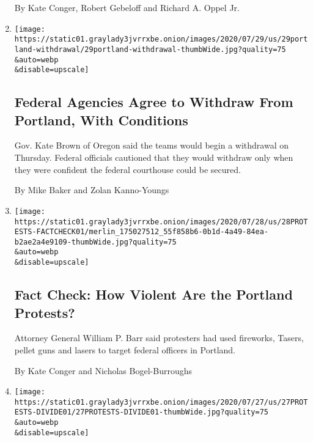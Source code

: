 \begin{enumerate}
  By Kate Conger, Robert Gebeloff and Richard A. Oppel Jr.
\item
  \href{/2020/07/29/us/protests-portland-federal-withdrawal.html}{}

  \texttt{[image: https://static01.graylady3jvrrxbe.onion/images/2020/07/29/us/29portland-withdrawal/29portland-withdrawal-thumbWide.jpg?quality=75\\\&auto=webp\\\&disable=upscale]}

  \hypertarget{federal-agencies-agree-to-withdraw-from-portland-with-conditions}{%
  \subsection{Federal Agencies Agree to Withdraw From Portland, With
  Conditions}\label{federal-agencies-agree-to-withdraw-from-portland-with-conditions}}

  Gov. Kate Brown of Oregon said the teams would begin a withdrawal on
  Thursday. Federal officials cautioned that they would withdraw only
  when they were confident the federal courthouse could be secured.

  By Mike Baker and Zolan Kanno-Youngs
\item
  \href{/2020/07/28/us/portland-protests-fact-check.html}{}

  \texttt{[image: https://static01.graylady3jvrrxbe.onion/images/2020/07/28/us/28PROTESTS-FACTCHECK01/merlin\_175027512\_55f858b6-0b1d-4a49-84ea-b2ae2a4e9109-thumbWide.jpg?quality=75\\\&auto=webp\\\&disable=upscale]}

  \hypertarget{fact-check-how-violent-are-the-portland-protests}{%
  \subsection{Fact Check: How Violent Are the Portland
  Protests?}\label{fact-check-how-violent-are-the-portland-protests}}

  Attorney General William P. Barr said protesters had used fireworks,
  Tasers, pellet guns and lasers to target federal officers in Portland.

  By Kate Conger and Nicholas Bogel-Burroughs
\item
  \href{/2020/07/27/us/protests-divisions-blm.html}{}

  \texttt{[image: https://static01.graylady3jvrrxbe.onion/images/2020/07/27/us/27PROTESTS-DIVIDE01/27PROTESTS-DIVIDE01-thumbWide.jpg?quality=75\\\&auto=webp\\\&disable=upscale]}

  \hypertarget{peaceful-protesters-with-room-for-rage-sympathize-with-aggressive-tactics}{%
}
\end{enumerate}
